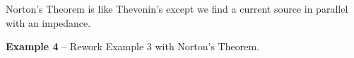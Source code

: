 \documentclass{handout}
\begin{document}
\newpage
\clearpage
\pagebreak

Norton's Theorem is like Thevenin's except we find a current source in parallel with an impedance.  

\textbf{Example 4} -- Rework Example 3 with Norton's Theorem.


\newpage
\clearpage
\pagebreak

\newpage
\clearpage
\pagebreak

\newpage
\clearpage
\pagebreak
\end{document}
